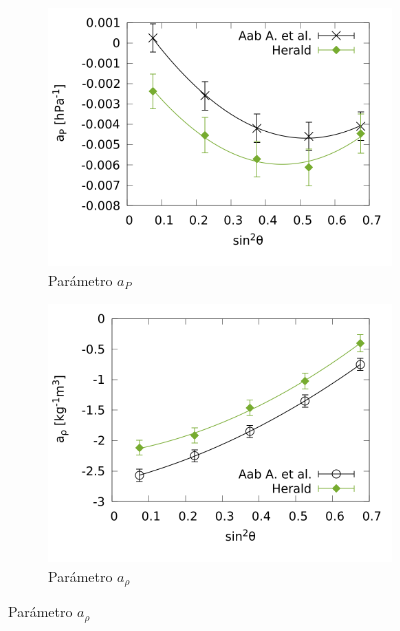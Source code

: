 				\begin{figure}[H]
					\begin{subfigure}[b]{0.5\textwidth}
					\includegraphics[width=\linewidth]{../Anisotropia/params/ap_2017_above_1EeV.png}
					\caption{Parámetro $a_P$ }
					\label{fig:ap_2017_1EeV}
					\end{subfigure}%
					\hspace{\fill}
					\begin{subfigure}[b]{0.5\textwidth}
					\includegraphics[width=\linewidth]{../Anisotropia/params/arho_2017_above_1EeV.png}
					\caption{Parámetro $a_{\rho}$ }
					\label{fig:arho_2017_1EeV}
					\end{subfigure}%
					\hspace{\fill}

\end{figure}
